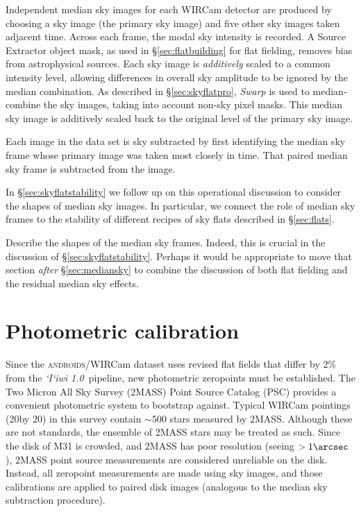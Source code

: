 \documentclass[iop]{emulateapj}
\newcommand{\sw}[1]{\textit{#1}} %
\newcommand{\iiwione}{\sw{`I`iwi 1.0}}
\newcommand{\androids}{\textsc{androids}}
\newcommand{\todo}[1]{\textcolor{RedOrange}{#1}} %
\newcommand{\Sec}[1]{\S\ref{sec:#1}}  %
\begin{document}
Independent median sky images for each WIRCam detector are produced by choosing a sky image (the primary sky image) and five other sky images taken adjacent time.
Across each frame, the modal sky intensity is recorded.
A Source Extractor object mask, as used in \Sec{flatbuilding} for flat fielding, removes bias from astrophysical sources.
Each sky image is \emph{additively} scaled to a common intensity level, allowing differences in overall sky amplitude to be ignored by the median combination.
As described in \S \ref{sec:skyflatpro}, \sw{Swarp} is used to median-combine the sky images, taking into account non-sky pixel masks.
This median sky image is additively scaled back to the original level of the primary sky image.

Each image in the data set is sky subtracted by first identifying the median sky frame whose primary image was taken most closely in time.
That paired median sky frame is subtracted from the image.

In \Sec{skyflatstability} we follow up on this operational discussion to consider the shapes of median sky images. In particular, we connect the role of median sky frames to the stability of different recipes of sky flats described in \Sec{flats}.

\todo{Describe the shapes of the median sky frames. Indeed, this is crucial in the discussion of \Sec{skyflatstability}. Perhaps it would be appropriate to move that section \emph{after} \Sec{mediansky} to combine the discussion of both flat fielding and the residual median sky effects.}

\section{Photometric calibration}
\label{sec:photocal}

Since the \androids/WIRCam dataset uses revised flat fields that differ by 2\% from the \iiwione\ pipeline, new photometric zeropoints must be established.
The Two Micron All Sky Survey (2MASS) Point Source Catalog (PSC) \citep{Skrutskie:2006} provides a convenient photometric system to bootstrap against.
Typical WIRCam pointings (20\arcmin by 20\arcmin) in this survey contain $\sim 500$ stars measured by 2MASS.
Although these are not standards, the ensemble of 2MASS stars may be treated as such.
Since the disk of M31 is crowded, and 2MASS has poor resolution (seeing $> 1\arcsec$), 2MASS point source measurements are considered unreliable on the disk.
Instead, all zeropoint measurements are made using sky images, and those calibrations are applied to paired disk images (analogous to the median sky subtraction procedure).
\end{document}
